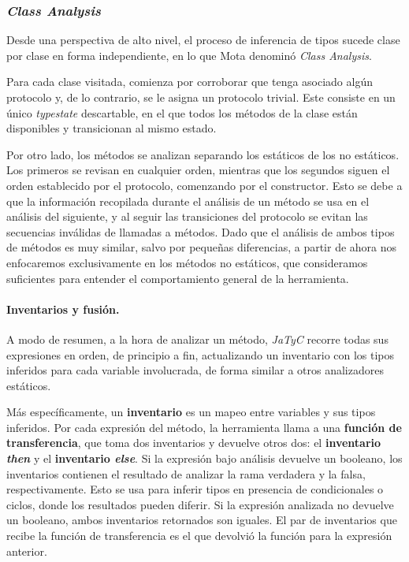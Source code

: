 \subsubsection{\textit{Class Analysis}}

Desde una perspectiva de alto nivel, el proceso de inferencia de tipos sucede clase por clase en forma independiente, en lo que Mota denominó \textit{Class Analysis}.

Para cada clase visitada, comienza por corroborar que tenga asociado algún protocolo y, de lo contrario, se le asigna un protocolo trivial. Este consiste en un único \textit{typestate} descartable, en el que todos los métodos de la clase están disponibles y transicionan al mismo estado.

Por otro lado, los métodos se analizan separando los estáticos de los no estáticos. Los primeros se revisan en cualquier orden, mientras que los segundos siguen el orden establecido por el protocolo, comenzando por el constructor. Esto se debe a que la información recopilada durante el análisis de un método se usa en el análisis del siguiente, y al seguir las transiciones del protocolo se evitan las secuencias inválidas de llamadas a métodos. Dado que el análisis de ambos tipos de métodos es muy similar, salvo por pequeñas diferencias, a partir de ahora nos enfocaremos exclusivamente en los métodos no estáticos, que consideramos suficientes para entender el comportamiento general de la herramienta.

\paragraph{Inventarios y fusión.}
A modo de resumen, a la hora de analizar un método, \textit{JaTyC} recorre todas sus expresiones en orden, de principio a fin, actualizando un inventario con los tipos inferidos para cada variable involucrada, de forma similar a otros analizadores estáticos.

Más específicamente, un \textbf{inventario} es un mapeo entre variables y sus tipos inferidos. Por cada expresión del método, la herramienta llama a una \textbf{función de transferencia}, que toma dos inventarios y devuelve otros dos: el \textbf{inventario \textit{then}} y el \textbf{inventario \textit{else}}. Si la expresión bajo análisis devuelve un booleano, los inventarios contienen el resultado de analizar la rama verdadera y la falsa, respectivamente. Esto se usa para inferir tipos en presencia de condicionales o ciclos, donde los resultados pueden diferir. Si la expresión analizada no devuelve un booleano, ambos inventarios retornados son iguales. El par de inventarios que recibe la función de transferencia es el que devolvió la función para la expresión anterior.

